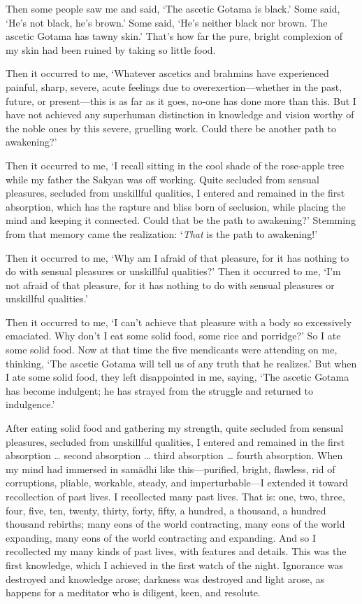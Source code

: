 \documentclass[12pt,openany]{book}%
\begin{document}
Then some people saw me and said, ‘The ascetic Gotama is black.’ Some said, ‘He’s not black, he’s brown.’ Some said, ‘He’s neither black nor brown. The ascetic Gotama has tawny skin.’ That’s how far the pure, bright complexion of my skin had been ruined by taking so little food. 

Then it occurred to me, ‘Whatever ascetics and brahmins have experienced painful, sharp, severe, acute feelings due to overexertion—whether in the past, future, or present—this is as far as it goes, no-one has done more than this. But I have not achieved any superhuman distinction in knowledge and vision worthy of the noble ones by this severe, gruelling work. Could there be another path to awakening?’ 

Then it occurred to me, ‘I recall sitting in the cool shade of the rose-apple tree while my father the Sakyan was off working. Quite secluded from sensual pleasures, secluded from unskillful qualities, I entered and remained in the first absorption, which has the rapture and bliss born of seclusion, while placing the mind and keeping it connected. Could that be the path to awakening?’ Stemming from that memory came the realization: ‘\emph{That} is the path to awakening!’ 

Then it occurred to me, ‘Why am I afraid of that pleasure, for it has nothing to do with sensual pleasures or unskillful qualities?’ Then it occurred to me, ‘I’m not afraid of that pleasure, for it has nothing to do with sensual pleasures or unskillful qualities.’ 

Then it occurred to me, ‘I can’t achieve that pleasure with a body so excessively emaciated. Why don’t I eat some solid food, some rice and porridge?’ So I ate some solid food. Now at that time the five mendicants were attending on me, thinking, ‘The ascetic Gotama will tell us of any truth that he realizes.’ But when I ate some solid food, they left disappointed in me, saying, ‘The ascetic Gotama has become indulgent; he has strayed from the struggle and returned to indulgence.’ 

After eating solid food and gathering my strength, quite secluded from sensual pleasures, secluded from unskillful qualities, I entered and remained in the first absorption … second absorption … third absorption … fourth absorption. When my mind had immersed in \textsanskrit{samādhi} like this—purified, bright, flawless, rid of corruptions, pliable, workable, steady, and imperturbable—I extended it toward recollection of past lives. I recollected many past lives. That is: one, two, three, four, five, ten, twenty, thirty, forty, fifty, a hundred, a thousand, a hundred thousand rebirths; many eons of the world contracting, many eons of the world expanding, many eons of the world contracting and expanding. And so I recollected my many kinds of past lives, with features and details. This was the first knowledge, which I achieved in the first watch of the night. Ignorance was destroyed and knowledge arose; darkness was destroyed and light arose, as happens for a meditator who is diligent, keen, and resolute. 
\end{document}
